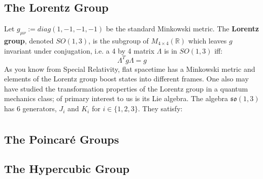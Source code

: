 \documentclass[11pt, oneside]{article}   	%
\theoremstyle{definition}
\begin{document}
\subsection{The Lorentz Group}

Let $g_{\mu\nu} := diag(1, -1, -1, -1)$ be the standard Minkowski metric. The \textbf{Lorentz group}, denoted $SO(1, 3)$, is the subgroup 
of $M_{4\times 4}(\mathbb R)$ which leaves $g$ invariant under conjugation, i.e. a 4 by 4 matrix $\Lambda$ is in $SO(1, 3)$ iff:
\begin{equation}
	\Lambda^T g\Lambda = g
\end{equation}
As you know from Special Relativity, flat spacetime has a Minkowski metric and elements of the Lorentz group boost states into different frames. 
One also may have studied the transformation properties of the Lorentz group in a quantum mechanics class; of primary interest to us is its 
Lie algebra. The algebra $\mathfrak{so}(1, 3)$ has 6 generators, $J_i$ and $K_i$ for $i\in\{1, 2, 3\}$. They satisfy:
\begin{align}

\end{align}

\subsection{The Poincar\'{e} Groups}

\subsection{The Hypercubic Group}
\end{document}
